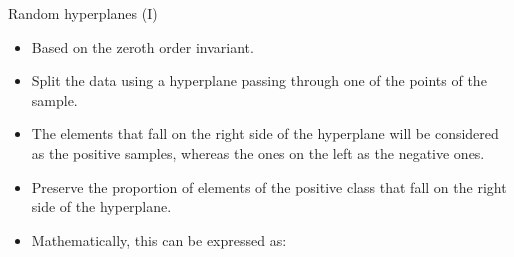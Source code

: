 \documentclass[10pt, dvipsnames]{beamer}
\begin{document}
\begin{frame}{Random hyperplanes (I)}
    \begin{itemize}
        \item<1-> Based on the \alert{zeroth order invariant}.
        \item<2-> Split the data using a hyperplane passing through one of the
        points of the sample.
        \item<3-> The elements that fall on the right side of the hyperplane will be considered
        as the positive samples, whereas the ones on the left as the negative ones.
        \item<4-> Preserve the proportion of elements of the positive class that fall on the
        right side of the hyperplane.
        \item<5-> Mathematically, this can be expressed as:
    \end{itemize}
    
    
    
\end{frame}
\end{document}
